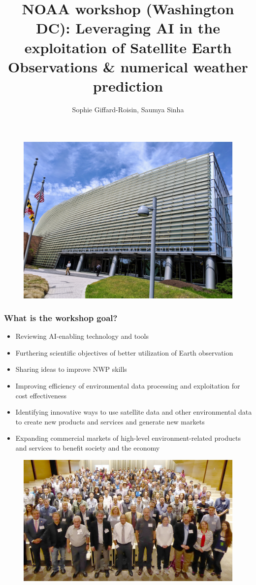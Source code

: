 \documentclass{beamer}
\title[NOAA Workshop] %
{NOAA workshop (Washington DC): Leveraging AI in the exploitation of Satellite Earth Observations \& numerical weather prediction}
\author{Sophie Giffard-Roisin, Saumya Sinha}
\institute[] %
{	
}
\date{} %
\begin{document}
\begin{frame}
\titlepage %
\begin{figure}
	\includegraphics[width=0.25\linewidth]{figs/NOAA_picture.jpg}
\end{figure}

\end{frame}

\begin{frame}
\frametitle{What is the workshop goal?}
\begin{itemize}
\footnotesize
    \item Reviewing AI-enabling technology and tools
    \item Furthering scientific objectives of better utilization of Earth observation
    \item Sharing ideas to improve NWP skills
    \item Improving efficiency of environmental data processing and exploitation for cost effectiveness
    \item Identifying innovative ways to use satellite data and other environmental data to create new products and services and generate new markets
    \item Expanding commercial markets of high-level environment-related products and services to benefit society and the economy

\end{itemize}
\begin{figure}
	\includegraphics[width=0.45\linewidth]{figs/AIWkshp2019_grouppic_1000x582.jpg}
\end{figure}
\end{frame}

\end{document}
